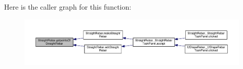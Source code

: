 Here is the caller graph for this function\+:\nopagebreak
\begin{figure}[H]
\begin{center}
\leavevmode
\includegraphics[width=350pt]{namespaceStraightRebar_a1873c6f7f59b355a64fdd966ad75f778_icgraph}
\end{center}
\end{figure}


